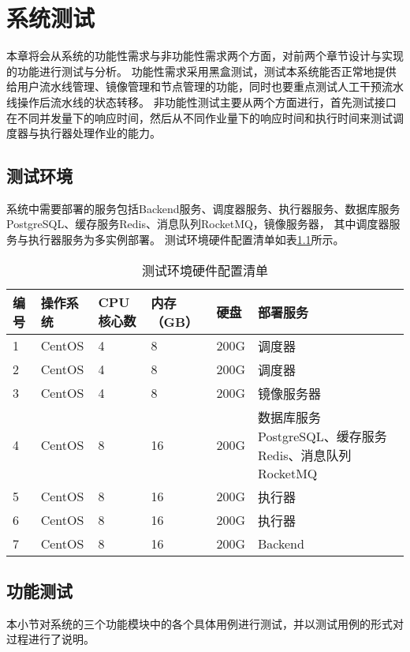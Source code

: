 
\chapter{系统测试}
本章将会从系统的功能性需求与非功能性需求两个方面，对前两个章节设计与实现的功能进行测试与分析。
功能性需求采用黑盒测试，测试本系统能否正常地提供给用户流水线管理、镜像管理和节点管理的功能，同时也要重点测试人工干预流水线操作后流水线的状态转移。
非功能性测试主要从两个方面进行，首先测试接口在不同并发量下的响应时间，然后从不同作业量下的响应时间和执行时间来测试调度器与执行器处理作业的能力。

\section{测试环境}
系统中需要部署的服务包括Backend服务、调度器服务、执行器服务、数据库服务PostgreSQL、缓存服务Redis、消息队列RocketMQ，镜像服务器，
其中调度器服务与执行器服务为多实例部署。
测试环境硬件配置清单如表\ref{tab:测试环境硬件配置清单}所示。

\begin{table}[ht]
  \centering
  \caption{测试环境硬件配置清单}
  \label{tab:测试环境硬件配置清单}
  \renewcommand{\arraystretch}{1.5}
  \begin{tabular}{|p{1cm}|p{1.5cm}|p{1cm}|p{1cm}|p{1cm}|p{6cm}|}
  \hline
  编号 & 操作系统 & CPU核心数 & 内存（GB）& 硬盘 & 部署服务 \\ \hline
  1 & CentOS & 4 & 8 & 200G & 调度器 \\ \hline
  2 & CentOS & 4 & 8 & 200G & 调度器 \\ \hline
  
  3 & CentOS & 4 & 8 & 200G & 镜像服务器 \\ \hline
  4 & CentOS & 8 & 16 & 200G & 数据库服务PostgreSQL、缓存服务Redis、消息队列RocketMQ \\ \hline
  5 & CentOS & 8 & 16 & 200G & 执行器 \\ \hline
  6 & CentOS & 8 & 16 & 200G & 执行器 \\ \hline
  7 & CentOS & 8 & 16 & 200G & Backend \\ \hline
  \end{tabular}
\end{table}


\section{功能测试}
本小节对系统的三个功能模块中的各个具体用例进行测试，并以测试用例的形式对过程进行了说明。

